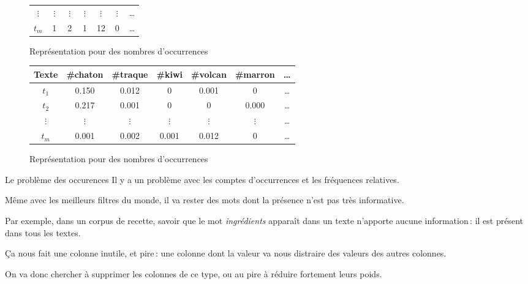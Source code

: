 \documentclass[../allslides.tex]{subfiles}
\begin{document}
\begin{frame}
\begin{overprint}
\begin{figure}
\begin{tabular}{c*{5}{S[table-format=4.0]}c}
					\(⋮\)	& \multicolumn{1}{c}{\(⋮\)}	& 	& 	& 	& 	& …\\
					\(t_m\)	& 1	& 2	& 1	& 12	& 0	& …\\
					\bottomrule
				\end{tabular}
				\caption{Représentation pour des nombres d'occurrences}
			\end{figure}
		\onslide<4>
			\begin{figure}
				\begin{tabular}{c*{5}{S}c}
					\toprule
					\textbf{Texte}	& {\textbf{\#chaton}}	& {\textbf{\#traque}}	& {\textbf{\#kiwi}}	& {\textbf{\#volcan}}	& {\textbf{\#marron}}	& {…}\\
					\midrule
					\(t_1\)	& 0.150	& 0.012	& 0	& 0.001	& 0	& …\\
					\(t_2\)	& 0.217	& 0.001	& 0	& 0	& 0.000	& …\\
					\(⋮\)	& 	& 	& 	& 	& 	& …\\
					\(t_m\)	& 0.001	& 0.002	& 0.001	& 0.012	& 0	& …\\
					\bottomrule
				\end{tabular}
				\caption{Représentation pour des nombres d'occurrences}
			\end{figure}
	\end{overprint}
\end{frame}




\begin{frame}{Le problème des occurences}
	Il y a un problème avec les comptes d'occurrences et les fréquences relatives.

	\pause

	Même avec les meilleurs filtres du monde, il va rester des mots dont la présence n'est pas très \alert{informative}.

	\pause

	Par exemple, dans un corpus de recette, savoir que le mot \emph{ingrédients} apparaît dans un texte n'apporte aucune information : il est \alert{présent dans tous les textes}.

	\pause

	Ça nous fait une colonne inutile, et pire : une colonne dont la valeur va nous distraire des valeurs des autres colonnes.

	\pause

	On va donc chercher à supprimer les colonnes de ce type, ou au pire à \alert{réduire fortement leurs poids}.
\end{frame}
\end{document}
